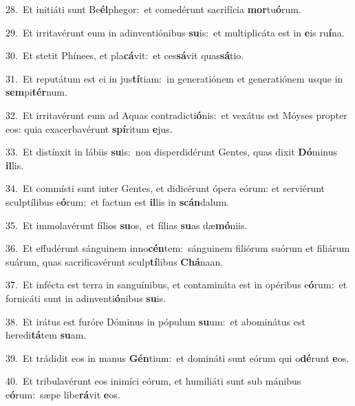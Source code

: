 {\numbfont\textcolor{\numbcolor}{28.}}~Et initiáti sunt Be\-\textbf{él}\-phegor:~\star et comedérunt sacrifícia \textbf{mor}\-tu\-\textbf{ó}\-rum.\par
{\numbfont\textcolor{\numbcolor}{29.}}~Et irritavérunt eum in adinventiónibus \textbf{su}\-is:~\star et multiplicáta est in \textbf{e}\-is ru\-\textbf{í}\-na.\par
{\numbfont\textcolor{\numbcolor}{30.}}~Et stetit Phínees, et pla\-\textbf{cá}\-vit:~\star et ces\-\textbf{sá}\-vit quas\-\textbf{sá}\-tio.\par
{\numbfont\textcolor{\numbcolor}{31.}}~Et reputátum est ei in jus\-\textbf{tí}\-tiam:~\star in generatiónem et generatiónem usque in \textbf{sem}\-pi\-\textbf{tér}\-num.\par
{\numbfont\textcolor{\numbcolor}{32.}}~Et irritavérunt eum ad Aquas contradicti\-\textbf{ó}\-nis:~\star et vexátus est Móyses propter eos: quia exacerbavérunt \textbf{spí}\-ritum \textbf{e}\-jus.\par
{\numbfont\textcolor{\numbcolor}{33.}}~Et distínxit in lábiis \textbf{su}\-is:~\star non disperdidérunt Gentes, quas dixit \textbf{Dó}\-minus \textbf{il}\-lis.\par
{\numbfont\textcolor{\numbcolor}{34.}}~Et commísti sunt inter Gentes, et didicérunt ópera eórum: et serviérunt sculptílibus e\-\textbf{ó}\-rum:~\star et factum est \textbf{il}\-lis in \textbf{scán}\-dalum.\par
{\numbfont\textcolor{\numbcolor}{35.}}~Et immolavérunt fílios \textbf{su}\-os,~\star et fílias \textbf{su}\-as dæ\-\textbf{mó}\-niis.\par
{\numbfont\textcolor{\numbcolor}{36.}}~Et effudérunt sánguinem inno\-\textbf{cén}\-tem:~\star sánguinem filiórum suórum et filiárum suárum, quas sacrificavérunt sculp\-\textbf{tí}\-libus \textbf{Chá}\-naan.\par
{\numbfont\textcolor{\numbcolor}{37.}}~Et infécta est terra in sanguínibus, et contamináta est in opéribus e\-\textbf{ó}\-rum:~\star et fornicáti sunt in adinventi\-\textbf{ó}\-nibus \textbf{su}\-is.\par
{\numbfont\textcolor{\numbcolor}{38.}}~Et irátus est furóre Dóminus in pópulum \textbf{su}\-um:~\star et abominátus est heredi\-\textbf{tá}\-tem \textbf{su}\-am.\par
{\numbfont\textcolor{\numbcolor}{39.}}~Et trádidit eos in manus \textbf{Gén}\-tium:~\star et domináti sunt eórum qui o\-\textbf{dé}\-runt \textbf{e}\-os.\par
{\numbfont\textcolor{\numbcolor}{40.}}~Et tribulavérunt eos inimíci eórum, et humiliáti sunt sub mánibus e\-\textbf{ó}\-rum:~\star sæpe libe\-\textbf{rá}\-vit \textbf{e}\-os.\par
